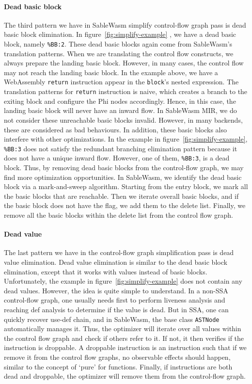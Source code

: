 \paragraph{Dead basic block}
The third pattern we have in SableWasm simplify control-flow graph pass is dead basic block elimination. In figure~\ref{fig:simplify-example} , we have a dead basic block, namely \texttt{\%BB:2}. These dead basic blocks again come from   SableWasm's translation patterns. When we are translating the control flow constructs, we always prepare the landing basic block. However, in many cases, the control flow may not reach the landing basic block. In the example above, we have a WebAssembly \texttt{return} instruction appear in the \texttt{block}'s nested expression. The translation patterns for \texttt{return} instruction is naive, which creates a branch to the exiting block and configure the Phi nodes accordingly. Hence, in this case, the landing basic block will never have an inward flow. In SableWasm MIR, we do not consider these unreachable basic blocks invalid. However, in many backends, these are considered as bad behaviours. In addition, these basic blocks also interfere with other optimizations. In the example in figure~\ref{fig:simplify-example}, \texttt{\%BB:3} does not satisfy the redundant branching elimination pattern because it does not have a unique inward flow. However, one of them, \texttt{\%BB:3}, is a dead block. Thus, by removing dead basic blocks from the control-flow graph, we may find more optimization opportunities. In SableWasm, we identify the dead basic block via a mark-and-sweep algorithm. Starting from the entry block, we mark all the basic blocks that are reachable. Then we iterate overall basic blocks, and if the basic block does not have the flag, we add them to the delete list. Finally, we remove all the basic blocks within the delete list from the control flow graph.

\paragraph{Dead value}
The last pattern we have in the control-flow graph simplification pass is dead value elimination. Dead value elimination is similar to the dead basic block elimination, except that it works with values instead of basic blocks. Unfortunately, the example in figure~\ref{fig:simplify-example} does not contain any dead values. However, the idea is quite simple to understand. In a non-SSA control-flow graph, one usually needs first to perform liveness analysis and reaching def analysis to determine if the value is dead. But in SSA, one can quickly recover use-def chain, and in SableWasm, the base class \texttt{ASTNode} automatically manages it. Thus, the optimizer will iterate over all values within the control flow graph and check if others refer to it. If not, it then verifies if the instruction is droppable. A droppable instruction is an instruction such that if we remove it from the control flow graphs, no observable effects should happen, similar to the concept of `pure' for functions. Finally, if instructions are both dead and droppable, the optimizer will remove them from the control-flow graph.

